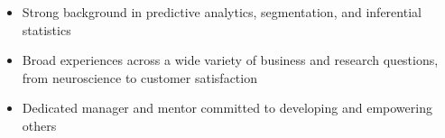 \begin{cvparagraph}
\begin{itemize}
\vspace{2.0mm}
\item {Strong background in predictive analytics, segmentation, and inferential statistics}
\item {Broad experiences across a wide variety of business and research questions, from neuroscience to customer satisfaction}
\item {Dedicated manager and mentor committed to developing and empowering others}
\end{itemize}
\end{cvparagraph}
